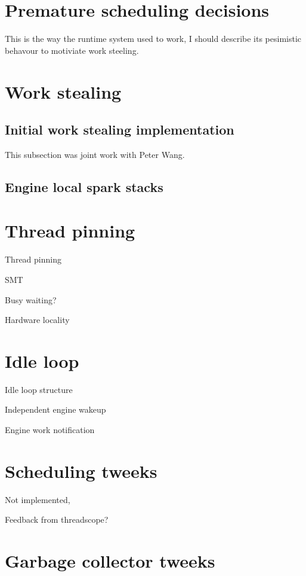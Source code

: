 

\section{Premature scheduling decisions}

This is the way the runtime system used to work,
I should describe its pesimistic behavour to motiviate work steeling.

\section{Work stealing}

\subsection{Initial work stealing implementation}

This subsection was joint work with Peter Wang.

\subsection{Engine local spark stacks}

\section{Thread pinning}

Thread pinning

SMT

Busy waiting?

Hardware locality

\section{Idle loop}

Idle loop structure

Independent engine wakeup

Engine work notification

\section{Scheduling tweeks}

Not implemented,

Feedback from threadscope?

\section{Garbage collector tweeks}

